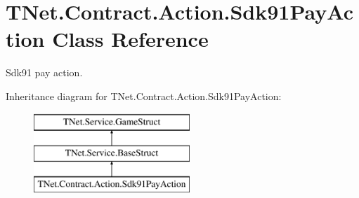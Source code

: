 \hypertarget{class_t_net_1_1_contract_1_1_action_1_1_sdk91_pay_action}{}\section{T\+Net.\+Contract.\+Action.\+Sdk91\+Pay\+Action Class Reference}
\label{class_t_net_1_1_contract_1_1_action_1_1_sdk91_pay_action}


Sdk91 pay action.  


Inheritance diagram for T\+Net.\+Contract.\+Action.\+Sdk91\+Pay\+Action\+:\begin{figure}[H]
\begin{center}
\leavevmode
\includegraphics[height=3.000000cm]{class_t_net_1_1_contract_1_1_action_1_1_sdk91_pay_action}
\end{center}
\end{figure}
